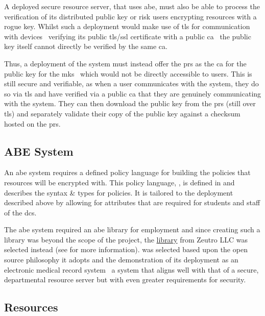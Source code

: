 A deployed secure resource server, that uses \acrfull{abe}, must also be able to process the verification of its distributed public key or risk users encrypting resources with a rogue key. Whilst such a deployment would make use of \acrshort{tls} for communication with devices \textemdash\ verifying its public \acrshort{tls}/\acrshort{ssl} certificate with a public \acrshort{ca} \textemdash\ the public key itself cannot directly be verified by the same \acrshort{ca}.

Thus, a deployment of the \theResServer system must instead offer the \acrfull{prs} as the \acrfull{ca} for the public key for the \acrfull{mks} \textemdash\ which would not be directly accessible to users. This is still secure and verifiable, as when a user communicates with the \theResServer system, they do so via \acrshort{tls} and have verified via a public \acrshort{ca} that they are genuinely communicating with the \theResServer system. They can then download the public key from the \acrshort{prs} (still over \acrshort{tls}) and separately validate their copy of the public key against a checksum hosted on the \acrshort{prs}.

\subsection{ABE System}
\label{subsec:design_abe_sys}

An \acrfull{abe} system requires a defined policy language for building the policies that resources will be encrypted with. This policy language, \thePolicyLang, is defined in  and describes the syntax \& types for policies. It is tailored to the deployment described above by allowing for attributes that are required for students and staff of the \acrshort{dcs}.

The \acrshort{abe} system required an \acrshort{abe} library for employment and since creating such a library was beyond the scope of the project, the \href{https://github.com/zeutro/openabe}{\OpenABE library} from Zeutro LLC was selected instead (see  for more information). \OpenABE was selected based upon the open source philosophy it adopts and the demonstration of its deployment as an electronic medical record system \citet{Akinyele2011} \textemdash\ a system that aligns well with that of a secure, departmental resource server but with even greater requirements for security.

\subsection{Resources}
\label{subsec:design_resources}

